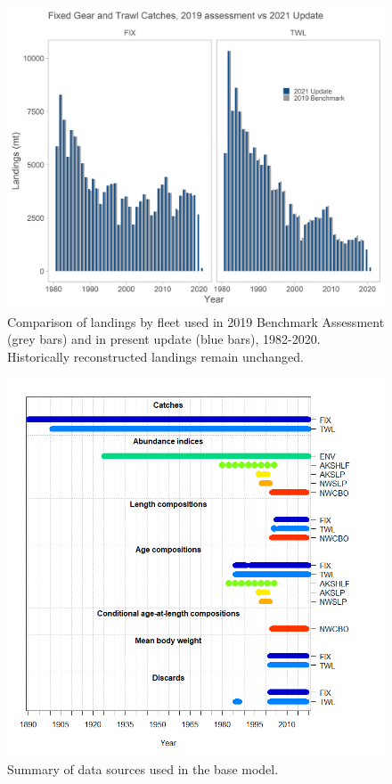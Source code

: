 \documentclass[11pt,
  english,
  a4paper,
]{article}
\begin{document}
\begin{figure}
\centering
\includegraphics[width=1\textwidth,height=1\textheight]{figs/coastwide_catch_comparison.png}
\caption{Comparison of landings by fleet used in 2019 Benchmark Assessment (grey bars) and in present update (blue bars), 1982-2020. Historically reconstructed landings remain unchanged. \label{fig:catch_comparison}}
\end{figure}

\tagmcend\tagstructend


\begin{figure}
\centering
\includegraphics[width=1\textwidth,height=1\textheight]{figs/data-plot.png}
\caption{Summary of data sources used in the base model.\label{fig:data-plot}}
\end{figure}
\end{document}
